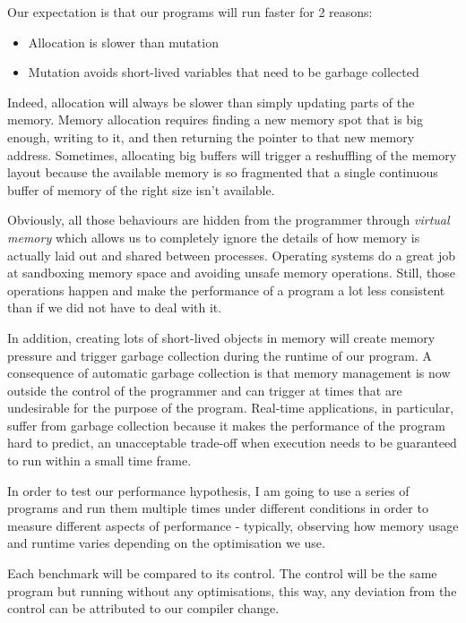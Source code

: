 \documentclass[
]{article}
\providecommand{\tightlist}{%
  \setlength{\itemsep}{0pt}\setlength{\parskip}{0pt}}
\begin{document}
Our expectation is that our programs will run faster for 2 reasons:

\begin{itemize}
\tightlist
\item
  Allocation is slower than mutation
\item
  Mutation avoids short-lived variables that need to be garbage
  collected
\end{itemize}

Indeed, allocation will always be slower than simply updating parts of
the memory. Memory allocation requires finding a new memory spot that is
big enough, writing to it, and then returning the pointer to that new
memory address. Sometimes, allocating big buffers will trigger a
reshuffling of the memory layout because the available memory is so
fragmented that a single continuous buffer of memory of the right size
isn't available.

Obviously, all those behaviours are hidden from the programmer through
\emph{virtual memory} which allows us to completely ignore the details
of how memory is actually laid out and shared between processes.
Operating systems do a great job at sandboxing memory space and avoiding
unsafe memory operations. Still, those operations happen and make the
performance of a program a lot less consistent than if we did not have
to deal with it.

In addition, creating lots of short-lived objects in memory will create
memory pressure and trigger garbage collection during the runtime of our
program. A consequence of automatic garbage collection is that memory
management is now outside the control of the programmer and can trigger
at times that are undesirable for the purpose of the program. Real-time
applications, in particular, suffer from garbage collection because it
makes the performance of the program hard to predict, an unacceptable
trade-off when execution needs to be guaranteed to run within a small
time frame.

In order to test our performance hypothesis, I am going to use a series
of programs and run them multiple times under different conditions in
order to measure different aspects of performance - typically, observing
how memory usage and runtime varies depending on the optimisation we
use.

Each benchmark will be compared to its control. The control will be the
same program but running without any optimisations, this way, any
deviation from the control can be attributed to our compiler change.
\end{document}
